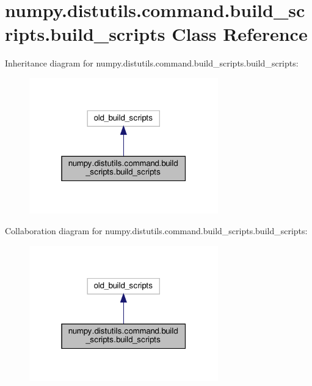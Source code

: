 \hypertarget{classnumpy_1_1distutils_1_1command_1_1build__scripts_1_1build__scripts}{}\section{numpy.\+distutils.\+command.\+build\+\_\+scripts.\+build\+\_\+scripts Class Reference}
\label{classnumpy_1_1distutils_1_1command_1_1build__scripts_1_1build__scripts}


Inheritance diagram for numpy.\+distutils.\+command.\+build\+\_\+scripts.\+build\+\_\+scripts\+:
\nopagebreak
\begin{figure}[H]
\begin{center}
\leavevmode
\includegraphics[width=232pt]{classnumpy_1_1distutils_1_1command_1_1build__scripts_1_1build__scripts__inherit__graph}
\end{center}
\end{figure}


Collaboration diagram for numpy.\+distutils.\+command.\+build\+\_\+scripts.\+build\+\_\+scripts\+:
\nopagebreak
\begin{figure}[H]
\begin{center}
\leavevmode
\includegraphics[width=232pt]{classnumpy_1_1distutils_1_1command_1_1build__scripts_1_1build__scripts__coll__graph}
\end{center}
\end{figure}
